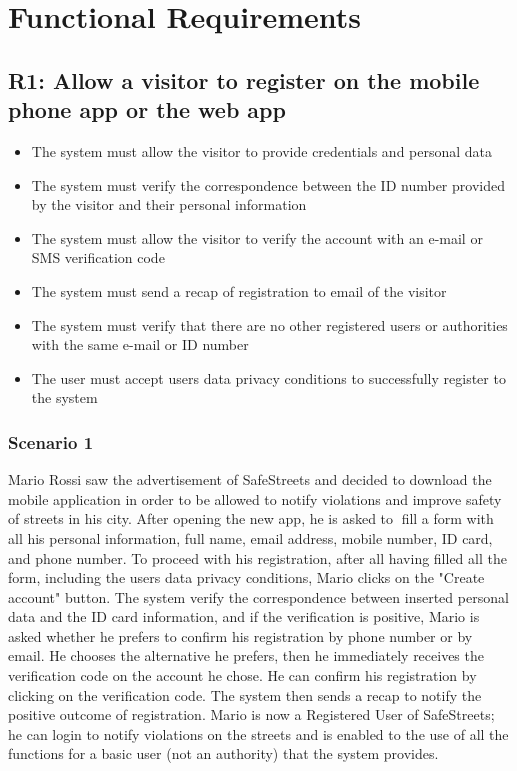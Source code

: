 \section{Functional Requirements}

\subsection{R1: Allow a visitor to register on the mobile phone app or the web app}
\begin{itemize}
    \item The system must allow the visitor to provide credentials and personal data
    \item The system must verify the correspondence between the ID number provided by the visitor and their personal information
    \item The system must allow the visitor to verify the account with an e-mail or SMS verification code
    \item The system must send a recap of registration to email of the visitor
    \item The system must verify that there are no other registered users or authorities with the same e-mail or ID number
    \item The user must accept users data privacy conditions to successfully register to the system
\end{itemize}
\subsubsection{Scenario 1}
Mario Rossi saw the advertisement of SafeStreets and decided to download the mobile application in order to be allowed to notify violations and improve safety of streets in his city. After
opening the new app, he is asked to fill a form with all his personal information, full name, email address, mobile number, ID card, and phone number. To proceed with his
registration, after all having filled all the form, including the users data privacy conditions, Mario clicks on the "Create account" button. The system verify the correspondence between inserted personal data and the ID card information,
and if the verification is positive, Mario is asked whether he prefers to confirm his registration by phone number or by email.
He chooses the alternative he prefers, then he immediately receives the verification code on the account he chose.
He can confirm his registration by clicking on the verification code. The system then sends a recap to notify the positive outcome of registration. Mario is now a Registered
User of SafeStreets; he can login to notify violations on the streets and is enabled to the use of all the functions for a basic user (not an authority) that the system provides.

